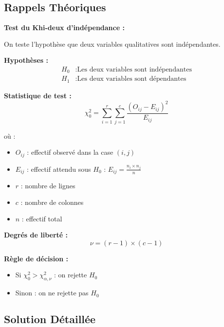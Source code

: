 \documentclass[11pt,a4paper]{article}
\newcommand{\chideux}{\chi^2}
\begin{document}
\subsection{Rappels Théoriques}

\begin{rappelbox}
\textbf{Test du Khi-deux d'indépendance :}

On teste l'hypothèse que deux variables qualitatives sont indépendantes.

\textbf{Hypothèses :}
\begin{align}
H_0 &: \text{Les deux variables sont indépendantes} \\
H_1 &: \text{Les deux variables sont dépendantes}
\end{align}

\textbf{Statistique de test :}
$$\chideux_0 = \sum_{i=1}^{r} \sum_{j=1}^{c} \frac{(O_{ij} - E_{ij})^2}{E_{ij}}$$

où :
\begin{itemize}
    \item $O_{ij}$ : effectif observé dans la case $(i,j)$
    \item $E_{ij}$ : effectif attendu sous $H_0$ : $E_{ij} = \frac{n_i \times n_j}{n}$
    \item $r$ : nombre de lignes
    \item $c$ : nombre de colonnes
    \item $n$ : effectif total
\end{itemize}

\textbf{Degrés de liberté :}
$$\nu = (r - 1) \times (c - 1)$$

\textbf{Règle de décision :}
\begin{itemize}
    \item Si $\chideux_0 > \chideux_{\alpha, \nu}$ : on rejette $H_0$
    \item Sinon : on ne rejette pas $H_0$
\end{itemize}
\end{rappelbox}

\subsection{Solution Détaillée}
\end{document}
